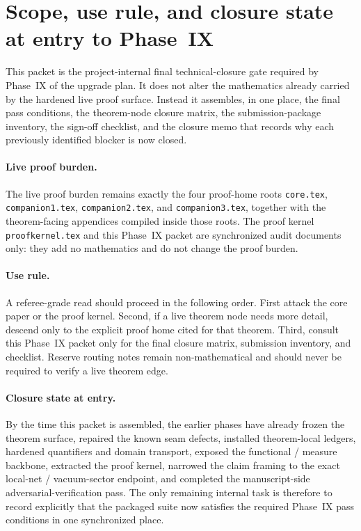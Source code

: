 \section{Scope, use rule, and closure state at entry to Phase~IX}\label{sec:p9-scope}

This packet is the project-internal final technical-closure gate required by Phase~IX of the upgrade plan. It does not alter the mathematics already carried by the hardened live proof surface. Instead it assembles, in one place, the final pass conditions, the theorem-node closure matrix, the submission-package inventory, the sign-off checklist, and the closure memo that records why each previously identified blocker is now closed.

\paragraph{Live proof burden.}
The live proof burden remains exactly the four proof-home roots \texttt{core.tex}, \texttt{companion1.tex}, \texttt{companion2.tex}, and \texttt{companion3.tex}, together with the theorem-facing appendices compiled inside those roots. The proof kernel \texttt{proofkernel.tex} and this Phase~IX packet are synchronized audit documents only: they add no mathematics and do not change the proof burden.

\paragraph{Use rule.}
A referee-grade read should proceed in the following order. First attack the core paper or the proof kernel. Second, if a live theorem node needs more detail, descend only to the explicit proof home cited for that theorem. Third, consult this Phase~IX packet only for the final closure matrix, submission inventory, and checklist. Reserve routing notes remain non-mathematical and should never be required to verify a live theorem edge.

\paragraph{Closure state at entry.}
By the time this packet is assembled, the earlier phases have already frozen the theorem surface, repaired the known seam defects, installed theorem-local ledgers, hardened quantifiers and domain transport, exposed the functional / measure backbone, extracted the proof kernel, narrowed the claim framing to the exact local-net / vacuum-sector endpoint, and completed the manuscript-side adversarial-verification pass. The only remaining internal task is therefore to record explicitly that the packaged suite now satisfies the required Phase~IX pass conditions in one synchronized place.
